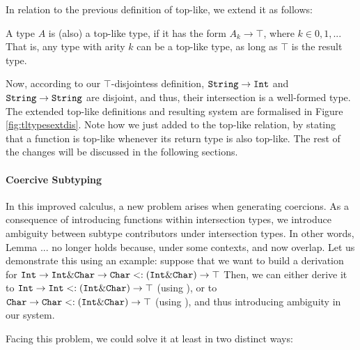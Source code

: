 In relation to the previous definition of top-like, we extend it as follows:
\begin{definition}
  
  A type $A$ is (also) a top-like type, if it has the form $A_k \to \top$, where $k \in {0,1,..}$.
  That is, any type with arity $k$ can be a top-like type, as long as $\top$ is the result type. 

\end{definition}

Now, according to our $\top$-disjointess definition,
$\texttt{String} \to \texttt{Int}$ and $\texttt{String} \to \texttt{String}$ are disjoint, and thus, their intersection is a 
well-formed type.
The extended top-like definitions and resulting system are formalised in Figure \ref{fig:tltypesextdis}.
Note how we just added  to the top-like relation, by stating that a function is top-like whenever
its return type is also top-like.
The rest of the changes will be discussed in the following sections.


\paragraph{Coercive Subtyping}

In this improved calculus, a new problem arises when generating coercions. 
As a consequence of introducing functions within intersection types, we introduce ambiguity between subtype contributors 
under intersection types.
In other words, Lemma ... no longer holds because, under some contexts, 
 and  now overlap. 
Let us demonstrate this using an example:
suppose that we want to build a derivation for  
$\texttt{Int} \to \texttt{Int} \& \texttt{Char} \to \texttt{Char} <: (\texttt{Int} \& \texttt{Char}) \to \top$
Then, we can either derive it to $\texttt{Int} \to \texttt{Int} <: (\texttt{Int} \& \texttt{Char}) \to \top$ 
(using ), or to $\texttt{Char} \to \texttt{Char} <: (\texttt{Int} \& \texttt{Char}) \to \top$
(using ), and thus introducing ambiguity in our system.

Facing this problem, we could solve it at least in two distinct ways:

